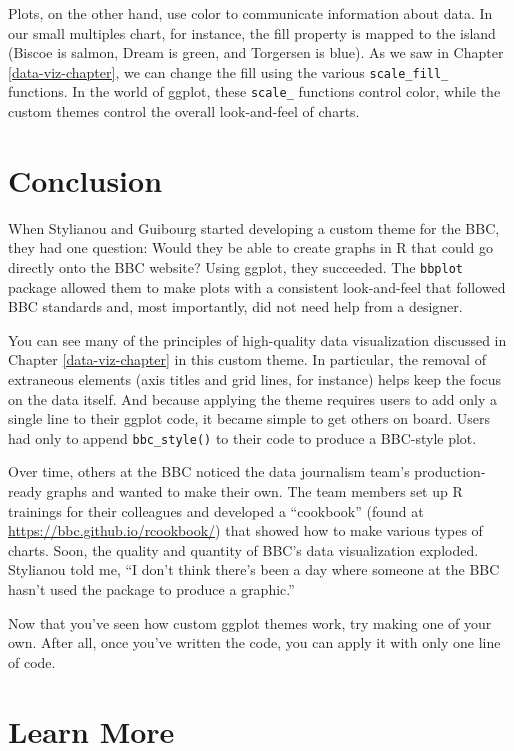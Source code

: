 \documentclass[
]{book}
\begin{document}
Plots, on the other hand, use color to communicate information about data. In our small multiples chart, for instance, the fill property is mapped to the island (Biscoe is salmon, Dream is green, and Torgersen is blue). As we saw in Chapter \ref{data-viz-chapter}, we can change the fill using the various \texttt{scale\_fill\_} functions. In the world of ggplot, these \texttt{scale\_} functions control color, while the custom themes control the overall look-and-feel of charts.

\hypertarget{conclusion-1}{%
\section*{Conclusion}\label{conclusion-1}}

When Stylianou and Guibourg started developing a custom theme for the BBC, they had one question: Would they be able to create graphs in R that could go directly onto the BBC website? Using ggplot, they succeeded. The \texttt{bbplot} package allowed them to make plots with a consistent look-and-feel that followed BBC standards and, most importantly, did not need help from a designer.

You can see many of the principles of high-quality data visualization discussed in Chapter \ref{data-viz-chapter} in this custom theme. In particular, the removal of extraneous elements (axis titles and grid lines, for instance) helps keep the focus on the data itself. And because applying the theme requires users to add only a single line to their ggplot code, it became simple to get others on board. Users had only to append \texttt{bbc\_style()} to their code to produce a BBC-style plot.

Over time, others at the BBC noticed the data journalism team's production-ready graphs and wanted to make their own. The team members set up R trainings for their colleagues and developed a ``cookbook'' (found at \url{https://bbc.github.io/rcookbook/}) that showed how to make various types of charts. Soon, the quality and quantity of BBC's data visualization exploded. Stylianou told me, ``I don't think there's been a day where someone at the BBC hasn't used the package to produce a graphic.''

Now that you've seen how custom ggplot themes work, try making one of your own. After all, once you've written the code, you can apply it with only one line of code.

\hypertarget{learn-more-2}{%
\section*{Learn More}\label{learn-more-2}}
\end{document}

